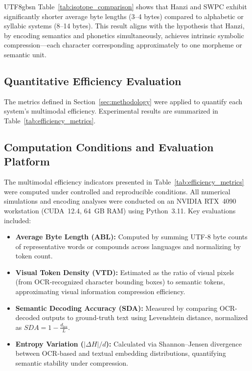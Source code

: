 \documentclass[conference]{IEEEtran}
\begin{document}
\begin{CJK*}{UTF8}{gbsn}
Table~\ref{tab:isotope_comparison} shows that Hanzi and SWPC exhibit significantly shorter average byte lengths (3–4 bytes) compared to alphabetic or syllabic systems (8–14 bytes).  
This result aligns with the hypothesis that Hanzi, by encoding semantics and phonetics simultaneously, achieves intrinsic symbolic compression—each character corresponding approximately to one morpheme or semantic unit.

\subsection{Quantitative Efficiency Evaluation}

The metrics defined in Section~\ref{sec:methodology} were applied to quantify each system’s multimodal efficiency.  
Experimental results are summarized in Table~\ref{tab:efficiency_metrics}.

\subsection{Computation Conditions and Evaluation Platform}

The multimodal efficiency indicators presented in Table~\ref{tab:efficiency_metrics} were computed under controlled and reproducible conditions. All numerical simulations and encoding analyses were conducted on an NVIDIA RTX~4090 workstation (CUDA~12.4, 64~GB RAM) using Python~3.11. Key evaluations included:

\begin{itemize}
    \item \textbf{Average Byte Length (ABL):} Computed by summing UTF-8 byte counts of representative words or compounds across languages and normalizing by token count.
    \item \textbf{Visual Token Density (VTD):} Estimated as the ratio of visual pixels (from OCR-recognized character bounding boxes) to semantic tokens, approximating visual information compression efficiency.
    \item \textbf{Semantic Decoding Accuracy (SDA):} Measured by comparing OCR-decoded outputs to ground-truth text using Levenshtein distance, normalized as $SDA = 1 - \frac{d_{lev}}{L}$.
    \item \textbf{Entropy Variation ($|\Delta H|/d$):} Calculated via Shannon–Jensen divergence between OCR-based and textual embedding distributions, quantifying semantic stability under compression.
\end{itemize}


\end{CJK*}
\end{document}
